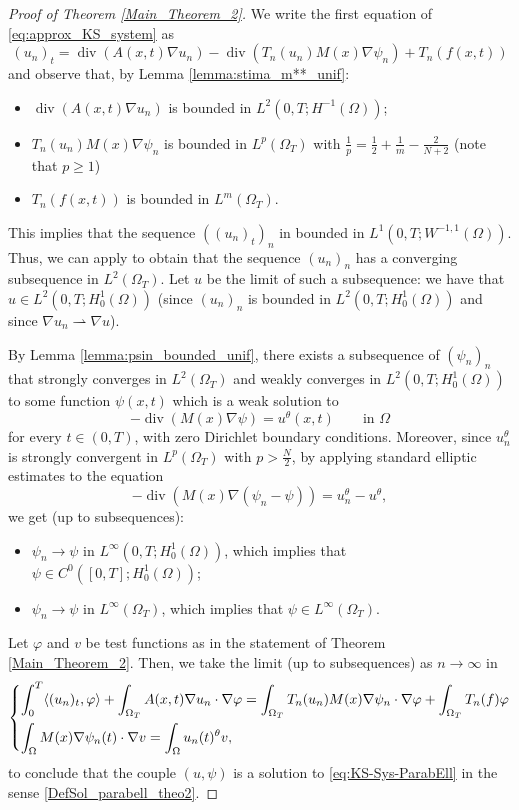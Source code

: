 \documentclass{amsart}
\numberwithin{equation}{section}
\def\elle#1{L^{#1}}
\def\elleomT#1{L^{#1}(\Omega_T)}
\def\Hom{H^1_0(\Omega)}
\def\io{\int_\Omega}
\def\ioT{\int_{\Omega_T}}
\begin{document}
\begin{proof}[Proof of Theorem \ref{Main_Theorem_2}]
    We write the first equation of \eqref{eq:approx_KS_system} as
    $$(u_n)_t=\operatorname{div}(A(x, t) \nabla u_n)-\operatorname{div}(T_n(u_n) M(x) \nabla \psi_n)+T_n(f(x,t))$$
    and observe that, by Lemma \ref{lemma:stima_m**_unif}:
    \begin{itemize}
        \item $\operatorname{div}(A(x, t) \nabla u_n)$ is bounded in $\elle2(0,T;H^{-1}(\Omega))$;
        \item $T_n(u_n) M(x) \nabla \psi_n$ is bounded in $\elleomT p$ with $\frac1p=\frac12+\frac 1m-\frac2{N+2}$ (note that $p\geq1$)
        \item  $T_n(f(x,t))$ is bounded in $\elleomT m$.
    \end{itemize}
    This implies that the sequence $((u_n)_t)_n$ in bounded in $\elle1(0,T;W^{-1,1}(\Omega))$.
    Thus, we can apply \cite[Corollary 4]{Simon} to obtain that the sequence $(u_n)_n$ has a converging subsequence in $\elleomT2$. Let $u$ be the limit of such a subsequence: we have that $u\in\elle2(0,T;\Hom)$ (since $(u_n)_n$ is bounded in $\elle2(0,T;\Hom)$ and since $\nabla u_n\rightharpoonup\nabla u$).

    By Lemma \ref{lemma:psin_bounded_unif}, there exists a subsequence of $(\psi_n)_n$ that strongly converges in $\elleomT2$ and weakly converges in $\elle2(0,T;\Hom)$ to some function $\psi(x,t)$ which is a weak solution to
    \[
    -\operatorname{div}(M(x)\nabla\psi)=u^\theta(x,t)\qquad \text{in }\Omega
    \]
    for every $t\in (0,T)$, with zero Dirichlet boundary conditions.
    Moreover, since $u_n^\theta$ is strongly convergent in $\elleomT p$ with $p>\frac{N}{2}$, by applying standard elliptic estimates \cite{BoccardoCroce} to the equation
    \[
    -\operatorname{div}(M(x)\nabla(\psi_n-\psi))=u_n^\theta-u^\theta,
    \]
    we get (up to subsequences):
    \begin{itemize}
        \item $\psi_n\to\psi$ in $\elle\infty(0,T;\Hom)$, which implies that $\psi\in C^0([0,T];\Hom)$; 
        \item $\psi_n\to\psi$ in $\elle\infty(\Omega_T)$, which implies that $\psi\in \elle\infty(\Omega_T)$.
    \end{itemize}

    Let $\varphi$ and $v$ be test functions as in the statement of Theorem \ref{Main_Theorem_2}. Then, we take the limit (up to subsequences) as $n\to\infty$ in 
    \begin{equation}
        \begin{dcases}
                \int_0^T \langle (u_n)_t,\varphi\rangle+\ioT A(x,t)\nabla u_n\cdot \nabla \varphi = \ioT T_n(u_n) M(x)\nabla \psi_n\cdot\nabla\varphi + \ioT T_n(f)\varphi\\
                \io M(x)\nabla \psi_n(t)\cdot\nabla v = \io u_n(t)^\theta v,
        \end{dcases}
    \end{equation}
    to conclude that the couple $(u,\psi)$ is a solution to \eqref{eq:KS-Sys-ParabEll} in the sense \eqref{DefSol_parabell_theo2}.
\end{proof}
\end{document}
